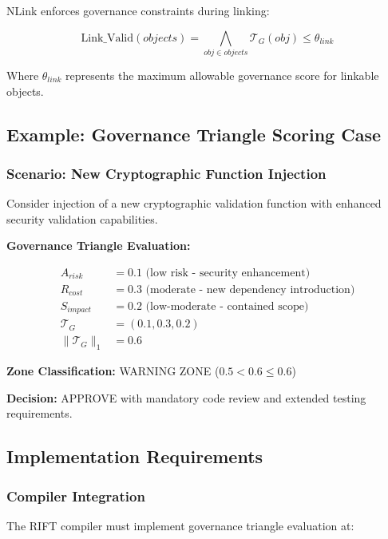 NLink enforces governance constraints during linking:

\begin{equation}
\text{Link\_Valid}(objects) = \bigwedge_{obj \in objects} \mathcal{T}_G(obj) \leq \theta_{link}
\end{equation}

Where $\theta_{link}$ represents the maximum allowable governance score for linkable objects.

\subsection{Example: Governance Triangle Scoring Case}

\subsubsection{Scenario: New Cryptographic Function Injection}

Consider injection of a new cryptographic validation function with enhanced security validation capabilities.

\textbf{Governance Triangle Evaluation:}

\begin{align}
A_{risk} &= 0.1 \text{ (low risk - security enhancement)} \\
R_{cost} &= 0.3 \text{ (moderate - new dependency introduction)} \\
S_{impact} &= 0.2 \text{ (low-moderate - contained scope)} \\
\mathcal{T}_G &= (0.1, 0.3, 0.2) \\
\|\mathcal{T}_G\|_1 &= 0.6
\end{align}

\textbf{Zone Classification:} WARNING ZONE ($0.5 < 0.6 \leq 0.6$)

\textbf{Decision:} APPROVE with mandatory code review and extended testing requirements.

\subsection{Implementation Requirements}

\subsubsection{Compiler Integration}

The RIFT compiler must implement governance triangle evaluation at:

